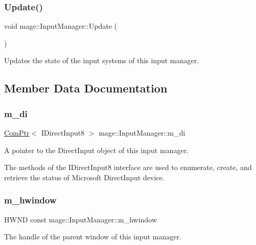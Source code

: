 \subsubsection{\texorpdfstring{Update()}{Update()}}
{\footnotesize\ttfamily void mage\+::\+Input\+Manager\+::\+Update (\begin{DoxyParamCaption}{ }\end{DoxyParamCaption})}

Updates the state of the input systems of this input manager. 

\subsection{Member Data Documentation}
\hypertarget{classmage_1_1_input_manager_a0ffbd0e68b5bab33c35f310625884f3a}{}\label{classmage_1_1_input_manager_a0ffbd0e68b5bab33c35f310625884f3a} 
\subsubsection{\texorpdfstring{m\+\_\+di}{m\_di}}
{\footnotesize\ttfamily \hyperlink{namespacemage_ae74f374780900893caa5555d1031fd79}{Com\+Ptr}$<$ I\+Direct\+Input8 $>$ mage\+::\+Input\+Manager\+::m\+\_\+di\hspace{0.3cm}{\ttfamily [private]}}

A pointer to the Direct\+Input object of this input manager.

The methods of the I\+Direct\+Input8 interface are used to enumerate, create, and retrieve the status of Microsoft Direct\+Input device. \hypertarget{classmage_1_1_input_manager_add8e8743b27a9c94caa1d793b31b0638}{}\label{classmage_1_1_input_manager_add8e8743b27a9c94caa1d793b31b0638} 
\subsubsection{\texorpdfstring{m\+\_\+hwindow}{m\_hwindow}}
{\footnotesize\ttfamily H\+W\+ND const mage\+::\+Input\+Manager\+::m\+\_\+hwindow\hspace{0.3cm}{\ttfamily [private]}}

The handle of the parent window of this input manager. \hypertarget{classmage_1_1_input_manager_a196bdd04e169e89d0fa5f6a4a180e4cb}{}\label{classmage_1_1_input_manager_a196bdd04e169e89d0fa5f6a4a180e4cb} 

